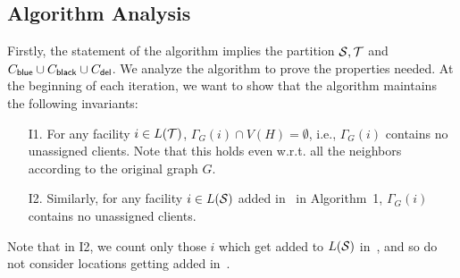 \subsection{Algorithm Analysis}
Firstly, the statement of the algorithm implies the partition ${\cal S}, {\cal T}$ and $C_{\mathsf{blue}}\cup C_{\mathsf{black}}\cup C_{\mathsf{del}}$.
We analyze the algorithm to prove the properties needed.
\medskip \noindent
At the beginning of each iteration, we want to show that the algorithm maintains the following invariants:
\begin{framed}
\begin{enumerate}%
	\item[I1.] For any facility $i\in L({\cal T})$, $\Gamma_G(i) \cap V(H) = \emptyset$, i.e., $\Gamma_G(i)$  contains no unassigned clients. Note that this holds even w.r.t. all the neighbors according to the original graph $G$.
\item[I2.] Similarly, for any facility $i \in L({\cal S})$  added in~ in Algorithm~1, $\Gamma_G(i)$ contains no unassigned clients.
\end{enumerate}
\end{framed}
Note that in I2, we count only those $i$ which get added to $L({\cal S})$ in~, and so do not consider locations getting added in~.

